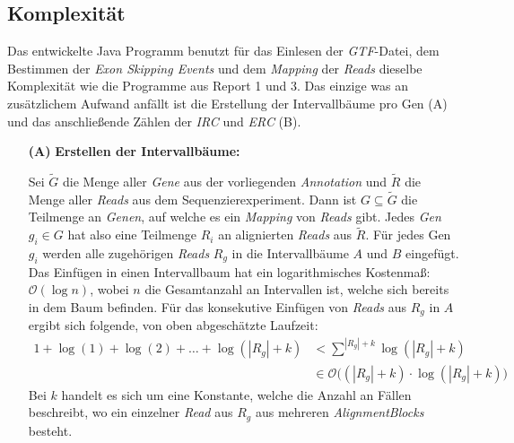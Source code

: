 \documentclass[12pt]{article}
\begin{document}
\subsection{Komplexität}\label{sec:Komplexität}
Das entwickelte Java Programm benutzt für das Einlesen der \textit{GTF}-Datei, dem Bestimmen
der \textit{Exon Skipping Events} und dem \textit{Mapping} der \textit{Reads} dieselbe Komplexität
wie die Programme aus Report 1 und 3.
Das einzige was an zusätzlichem Aufwand anfällt ist die Erstellung der Intervallbäume pro Gen (A) und das 
anschlie\ss ende Zählen der \textit{IRC} und \textit{ERC} (B).
\begin{itemize}
    \item[\textbf{(A)}] \textbf{Erstellen der Intervallbäume:} 

        Sei $\tilde G$ die Menge aller \textit{Gene} aus der vorliegenden \textit{Annotation} und
        $\tilde R$ die Menge aller \textit{Reads} aus dem Sequenzierexperiment.
        Dann ist $G \subseteq \tilde G$ die Teilmenge an \textit{Genen}, auf 
        welche es ein \textit{Mapping} von \textit{Reads} gibt.
        Jedes \textit{Gen} $g_{i} \in  G$ hat also eine Teilmenge $R_{i}$ an
        alignierten \textit{Reads} aus $\tilde R$.
        Für jedes Gen $g_{i}$ werden alle zugehörigen \textit{Reads} $R_{g}$
        in die Intervallbäume $A$ und $B$ eingefügt.
        Das Einfügen in einen Intervallbaum hat ein logarithmisches 
        Kostenma\ss : $\mathcal{O}(\log n)$, wobei $n$ die Gesamtanzahl an
        Intervallen ist, welche sich bereits in dem Baum befinden.
        Für das konsekutive Einfügen von \textit{Reads} aus $R_{g}$ in $A$ ergibt sich folgende, von 
        oben abgeschätzte Laufzeit:
        \begin{align*}
            1  + \log(1) + \log(2) + \dots + \log(|R_{g}| + k) &< \sum^{|R_{g}| + k} \log (|R_{g}| + k) \\
                                                               &\in \mathcal{O}\Big((|R_{g}| + k) \cdot \log(|R_{g}| + k)\Big)
        \end{align*}
        Bei $k$ handelt es sich um eine Konstante, welche die Anzahl an Fällen beschreibt,
        wo ein einzelner \textit{Read} aus $R_{g}$ aus mehreren \textit{AlignmentBlocks} besteht.


\end{itemize}
\end{document}
